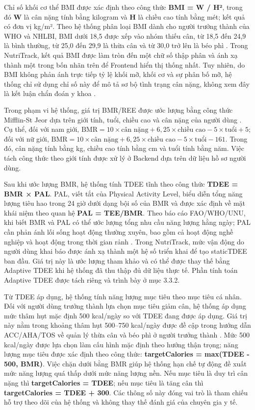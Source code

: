\documentclass[12pt, a4paper]{report}
\begin{document}
Chỉ số khối cơ thể BMI được xác định theo công thức \textbf{BMI = W / H²}, trong đó \textbf{W} là cân nặng tính bằng kilogram và \textbf{H} là chiều cao tính bằng mét; kết quả có đơn vị kg/m². Theo hệ thống phân loại BMI dành cho người trưởng thành của WHO và NHLBI, BMI dưới 18,5 được xếp vào nhóm thiếu cân, từ 18,5 đến 24,9 là bình thường, từ 25,0 đến 29,9 là thừa cân và từ 30,0 trở lên là béo phì \cite{jankau2025}. Trong NutriTrack, kết quả BMI được làm tròn đến một chữ số thập phân và ánh xạ thành một trong bốn nhãn trên để Frontend hiển thị thống nhất. Tuy nhiên, do BMI không phản ánh trực tiếp tỷ lệ khối mỡ, khối cơ và sự phân bố mỡ, hệ thống chỉ sử dụng chỉ số này để mô tả sơ bộ tình trạng cân nặng, không xem đây là kết luận chẩn đoán y khoa \cite{jankau2025}.

Trong phạm vi hệ thống, giá trị BMR/REE được ước lượng bằng công thức Mifflin-St Jeor dựa trên giới tính, tuổi, chiều cao và cân nặng của người dùng \cite{mifflin1990}. Cụ thể, đối với nam giới, $\text{BMR} = 10 \times \text{cân nặng} + 6,25 \times \text{chiều cao} - 5 \times \text{tuổi} + 5$; đối với nữ giới, $\text{BMR} = 10 \times \text{cân nặng} + 6,25 \times \text{chiều cao} - 5 \times \text{tuổi} - 161$. Trong đó, cân nặng tính bằng kg, chiều cao tính bằng cm và tuổi tính bằng năm. Việc tách công thức theo giới tính được xử lý ở Backend dựa trên dữ liệu hồ sơ người dùng.

Sau khi ước lượng BMR, hệ thống tính TDEE tĩnh theo công thức \textbf{TDEE = BMR × PAL}. PAL, viết tắt của Physical Activity Level, biểu diễn tổng năng lượng tiêu hao trong 24 giờ dưới dạng bội số của BMR và được xác định về mặt khái niệm theo quan hệ \textbf{PAL = TEE/BMR}. Theo báo cáo FAO/WHO/UNU, khi biết BMR và PAL có thể ước lượng tổng nhu cầu năng lượng hằng ngày; PAL cần phản ánh lối sống hoạt động thường xuyên, bao gồm cả hoạt động nghề nghiệp và hoạt động trong thời gian rảnh \cite{fao_who_unu_2001}. Trong NutriTrack, mức vận động do người dùng khai báo được ánh xạ thành một hệ số triển khai để tạo staticTDEE ban đầu. Giá trị này là ước lượng tham khảo và có thể được thay thế bằng Adaptive TDEE khi hệ thống đã thu thập đủ dữ liệu thực tế. Phần tính toán Adaptive TDEE được tách riêng và trình bày ở mục 3.3.2.

Từ TDEE áp dụng, hệ thống tính năng lượng mục tiêu theo mục tiêu cá nhân. Đối với người dùng trưởng thành lựa chọn mục tiêu giảm cân, hệ thống áp dụng mức thâm hụt mặc định 500 kcal/ngày so với TDEE đang được áp dụng. Giá trị này nằm trong khoảng thâm hụt 500–750 kcal/ngày được đề cập trong hướng dẫn ACC/AHA/TOS về quản lý thừa cân và béo phì ở người trưởng thành \cite{jensen2014}. Mức 500 kcal/ngày được lựa chọn làm cấu hình mặc định theo hướng thận trọng; năng lượng mục tiêu được xác định theo công thức: \textbf{targetCalories = max(TDEE - 500, BMR)}. Việc chặn dưới bằng BMR giúp hệ thống hạn chế tự động đề xuất mức năng lượng quá thấp dưới mức năng lượng nền. Nếu mục tiêu là duy trì cân nặng thì \textbf{targetCalories = TDEE}; nếu mục tiêu là tăng cân thì \textbf{targetCalories = TDEE + 300}. Các thông số này đóng vai trò là tham chiếu hỗ trợ theo dõi của hệ thống và không thay thế đánh giá của chuyên gia y tế.
\end{document}
